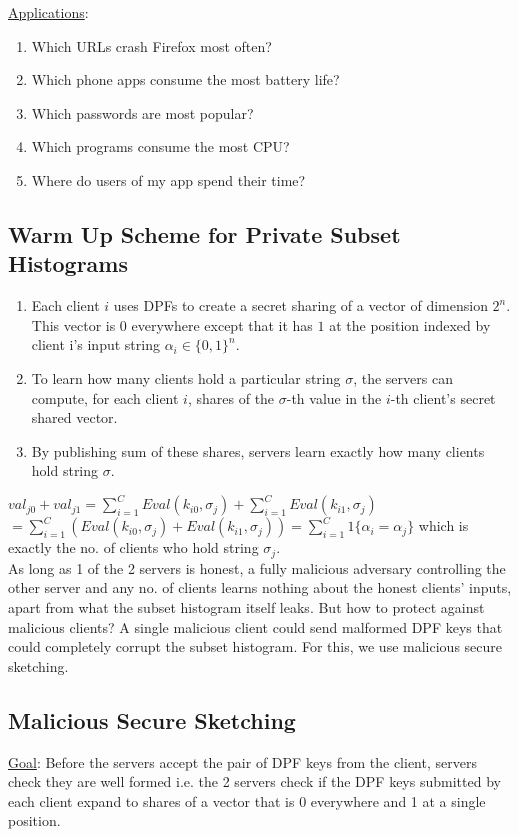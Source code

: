 \noindent \underline{Applications}:
\begin{enumerate}
   \item Which URLs crash Firefox most often? 
   \item Which phone apps consume the most battery life?
   \item Which passwords are most popular?
   \item Which programs consume the most CPU?
   \item Where do users of my app spend their time?
\end{enumerate}

\subsection{Warm Up Scheme for Private Subset Histograms}
\begin{enumerate}
    \item Each client $i$ uses DPFs to create a secret sharing of a vector of dimension $2^n$. This vector is 0 everywhere except that it has $1$ at the position indexed by client i's input string $\alpha_i \in \{0, 1\}^n$.
    \item To learn how many clients hold a particular string $\sigma$, the servers can compute, for each client $i$, shares of the $\sigma$-th value in the $i$-th client's secret shared vector.
    \item By publishing sum of these shares, servers learn exactly how many clients hold string $\sigma$.
\end{enumerate}

$val_{j0} + val_{j1} = \sum_{i=1}^C Eval(k_{i0}, \sigma_j) +  \sum_{i=1}^C Eval(k_{i1}, \sigma_j)$ \\
$= \sum_{i=1}^C (Eval(k_{i0}, \sigma_j) +  Eval(k_{i1}, \sigma_j)) = \sum_{i=1}^C 1\{\alpha_i = \alpha_j\}$ which is exactly the no. of clients who hold string $\sigma_j$. \\

As long as 1 of the 2 servers is honest, a fully malicious adversary controlling the other server and any no. of clients learns nothing about the honest clients' inputs, apart from what the subset histogram itself leaks. But how to protect against malicious clients? A single malicious client could send malformed DPF keys that could completely corrupt the subset histogram. For this, we use malicious secure sketching.

\subsection{Malicious Secure Sketching}
\underline{Goal}: Before the servers accept the pair of DPF keys from the client, servers check they are well formed i.e. the 2 servers check if the DPF keys submitted by each client expand to shares of a vector that is 0 everywhere and 1 at a single position. 

